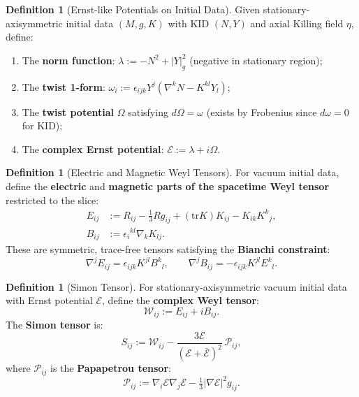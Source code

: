 \documentclass[12pt]{article}
\theoremstyle{plain}
\theoremstyle{definition}
\newtheorem{definition}[theorem]{Definition}
\theoremstyle{remark}
\newcommand{\tr}{\mathrm{tr}}
\begin{document}
\begin{definition}[Ernst-like Potentials on Initial Data]\label{def:ernst-potentials}
Given stationary-axisymmetric initial data $(M, g, K)$ with KID $(N, Y)$ and axial Killing field $\eta$, define:
\begin{enumerate}
    \item The \textbf{norm function}: $\lambda := -N^2 + |Y|^2_g$ (negative in stationary region);
    \item The \textbf{twist 1-form}: $\omega_i := \epsilon_{ijk}Y^j(\nabla^k N - K^{kl}Y_l)$;
    \item The \textbf{twist potential} $\Omega$ satisfying $d\Omega = \omega$ (exists by Frobenius since $d\omega = 0$ for KID);
    \item The \textbf{complex Ernst potential}: $\mathcal{E} := \lambda + i\Omega$.
\end{enumerate}
\end{definition}

\begin{definition}[Electric and Magnetic Weyl Tensors]\label{def:EB-weyl}
For vacuum initial data, define the \textbf{electric} and \textbf{magnetic parts of the spacetime Weyl tensor} restricted to the slice:
\begin{align}
E_{ij} &:= R_{ij} - \frac{1}{3}Rg_{ij} + (\tr K)K_{ij} - K_{ik}K^k{}_j, \label{eq:E-weyl}\\
B_{ij} &:= \epsilon_i{}^{kl}\nabla_k K_{lj}. \label{eq:B-weyl}
\end{align}
These are symmetric, trace-free tensors satisfying the \textbf{Bianchi constraint}:
\begin{equation}\label{eq:bianchi-system}
\nabla^j E_{ij} = \epsilon_{ijk}K^{jl}B^k{}_l, \qquad \nabla^j B_{ij} = -\epsilon_{ijk}K^{jl}E^k{}_l.
\end{equation}
\end{definition}

\begin{definition}[Simon Tensor]\label{def:simon-tensor}
For stationary-axisymmetric vacuum initial data with Ernst potential $\mathcal{E}$, define the \textbf{complex Weyl tensor}:
\[
\mathcal{W}_{ij} := E_{ij} + iB_{ij}.
\]
The \textbf{Simon tensor} is:
\begin{equation}\label{eq:simon-tensor}
S_{ij} := \mathcal{W}_{ij} - \frac{3\mathcal{E}}{(\mathcal{E} + \bar{\mathcal{E}})^2}\,\mathcal{P}_{ij},
\end{equation}
where $\mathcal{P}_{ij}$ is the \textbf{Papapetrou tensor}:
\[
\mathcal{P}_{ij} := \nabla_i\mathcal{E}\nabla_j\mathcal{E} - \tfrac{1}{3}|\nabla\mathcal{E}|^2 g_{ij}.
\]
\end{definition}
\end{document}
